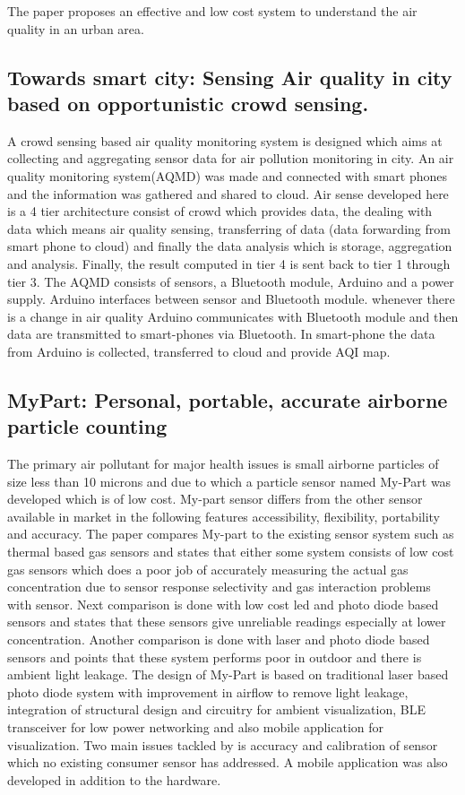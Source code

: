 \documentclass[11pt]{article}
\begin{document}
The paper proposes an effective and low cost system to understand the air quality in an urban area.

\subsection{Towards smart city: Sensing Air quality in city based on opportunistic crowd sensing.}

A crowd sensing based air quality monitoring system is designed which aims at collecting and aggregating sensor data for air pollution monitoring in city. An air quality monitoring system(AQMD) was made and connected with smart phones and the information was gathered and shared to cloud. Air sense developed here is a 4 tier architecture consist of crowd which provides data, the dealing with data which means air quality sensing, transferring of data (data forwarding from smart phone to cloud) and finally the data analysis which is storage, aggregation and analysis. Finally, the result computed in tier 4 is sent back to tier 1 through tier 3. The AQMD consists of sensors, a Bluetooth module, Arduino and a power supply. Arduino interfaces between sensor and Bluetooth module. whenever there is a change in air quality Arduino communicates with Bluetooth module and then data are transmitted to smart-phones via Bluetooth. In smart-phone the data from Arduino is collected, transferred to cloud and provide AQI map.

\subsection{MyPart: Personal, portable, accurate airborne particle counting}

The primary air pollutant for major health issues is small airborne particles of size less than 10 microns and due to which a particle sensor named My-Part was developed which is of low cost. My-part sensor differs from the other sensor available in market in the following features accessibility, flexibility, portability and accuracy.
	 The paper compares My-part to the existing sensor system such as thermal based gas sensors and states that either some system consists of low cost gas sensors which does a poor job of accurately measuring the actual gas concentration due to sensor response selectivity and gas interaction problems with sensor. 
	 Next comparison is done with low cost led and photo diode based sensors and states that these sensors give unreliable readings especially at lower concentration. Another comparison is done with laser and photo diode based sensors and points that these system performs poor in outdoor and there is ambient light leakage. The design of My-Part is based on traditional laser based photo diode system with improvement in airflow to remove light leakage, integration of structural design and circuitry for ambient visualization, BLE transceiver for low power networking and also mobile application for visualization. Two main issues tackled by  is accuracy and calibration of sensor which no existing consumer sensor has addressed. A mobile application was also developed in addition to the hardware.
\end{document}

